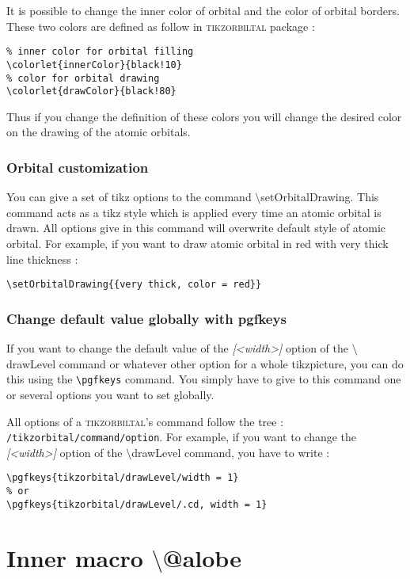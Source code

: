 \documentclass[10pt]{article}
\newcommand*{\cmd}[1]{{\ttfamily\color{blue!50!black}$\setminus$#1}\xspace}
\newcommand*{\opt}[1]{{\ttfamily\itshape\color{green!60!black}[<#1>]}\xspace}
\newcommand{\package}{\textsc{\sffamily\color{blue!50!black}tikzorbiltal}\xspace}
\begin{document}
It is possible to change the inner color of orbital and the color of orbital borders. These two colors are defined as follow in \package package :

\begin{lstlisting}
% inner color for orbital filling
\colorlet{innerColor}{black!10}
% color for orbital drawing
\colorlet{drawColor}{black!80}
\end{lstlisting}

Thus if you change the definition of these colors you will change the desired color on the drawing of the atomic orbitals.

\subsubsection*{Orbital customization}

You can give a set of tikz options to the command \cmd{setOrbitalDrawing}. This command acts as a tikz style which is applied every time an atomic orbital is drawn. All options give in this command will overwrite default style of atomic orbital. For example, if you want to draw atomic orbital in red with very thick line thickness :

\begin{lstlisting}
\setOrbitalDrawing{{very thick, color = red}}
\end{lstlisting}

\subsubsection*{Change default value globally with pgfkeys}

If you want to change the default value of the \opt{width} option of the \cmd{drawLevel} command or whatever other option for a whole tikzpicture, you can do this using the \lstinline!\pgfkeys! command. You simply have to give to this command one or several options you want to set globally.

All options of a \package's command follow the tree : \texttt{/tikzorbital/command/option}. For example, if you want to change the \opt{width} option of the \cmd{drawLevel} command, you have to write :
%
\begin{lstlisting}
\pgfkeys{tikzorbital/drawLevel/width = 1}
% or
\pgfkeys{tikzorbital/drawLevel/.cd, width = 1}
\end{lstlisting}

\section{Inner macro \cmd{@alobe}}
\end{document}
